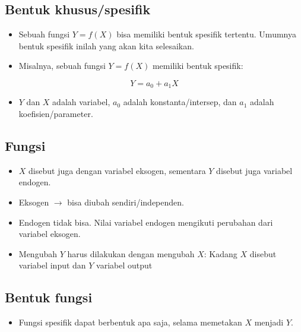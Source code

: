 \documentclass[
  letterpaper,
  DIV=11,
  numbers=noendperiod]{scrartcl}
\providecommand{\tightlist}{%
  \setlength{\itemsep}{0pt}\setlength{\parskip}{0pt}}\usepackage{longtable,booktabs,array}
\begin{document}
\hypertarget{bentuk-khususspesifik}{%
\subsection{Bentuk khusus/spesifik}\label{bentuk-khususspesifik}}

\begin{itemize}
\item
  Sebuah fungsi \(Y=f(X)\) bisa memiliki bentuk spesifik tertentu.
  Umumnya bentuk spesifik inilah yang akan kita selesaikan.
\item
  Misalnya, sebuah fungsi \(Y=f(X)\) memiliki bentuk spesifik:
\end{itemize}

\[
Y=a_0+a_1X
\]

\begin{itemize}
\tightlist
\item
  \(Y\) dan \(X\) adalah variabel, \(a_0\) adalah konstanta/intersep,
  dan \(a_1\) adalah koefisien/parameter.
\end{itemize}

\hypertarget{fungsi}{%
\subsection{Fungsi}\label{fungsi}}

\begin{itemize}
\item
  \(X\) disebut juga dengan variabel eksogen, sementara \(Y\) disebut
  juga variabel endogen.
\item
  Eksogen \(\rightarrow\) bisa diubah sendiri/independen.
\item
  Endogen tidak bisa. Nilai variabel endogen mengikuti perubahan dari
  variabel eksogen.
\item
  Mengubah \(Y\) harus dilakukan dengan mengubah \(X\): Kadang \(X\)
  disebut variabel input dan \(Y\) variabel output
\end{itemize}

\hypertarget{bentuk-fungsi}{%
\subsection{Bentuk fungsi}\label{bentuk-fungsi}}

\begin{itemize}
\tightlist
\item
  Fungsi spesifik dapat berbentuk apa saja, selama memetakan \(X\)
  menjadi \(Y\).
\end{itemize}
\end{document}
